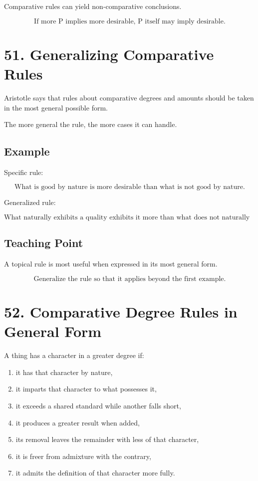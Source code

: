 \documentclass[12pt]{article}
\begin{document}
Comparative rules can yield non-comparative conclusions.

\[
\boxed{
\text{If more P implies more desirable, P itself may imply desirable.}
}
\]

\section*{51. Generalizing Comparative Rules}

Aristotle says that rules about comparative degrees and amounts should be taken
in the most general possible form.

The more general the rule, the more cases it can handle.

\subsection*{Example}

Specific rule:

\[
\text{What is good by nature is more desirable than what is not good by nature.}
\]

Generalized rule:

\[
\text{What naturally exhibits a quality exhibits it more than what does not naturally exhibit it.}
\]

\subsection*{Teaching Point}

A topical rule is most useful when expressed in its most general form.

\[
\boxed{
\text{Generalize the rule so that it applies beyond the first example.}
}
\]

\section*{52. Comparative Degree Rules in General Form}

A thing has a character in a greater degree if:

\begin{enumerate}[itemsep=0.25em]
    \item it has that character by nature,
    \item it imparts that character to what possesses it,
    \item it exceeds a shared standard while another falls short,
    \item it produces a greater result when added,
    \item its removal leaves the remainder with less of that character,
    \item it is freer from admixture with the contrary,
    \item it admits the definition of that character more fully.
\end{enumerate}
\end{document}
